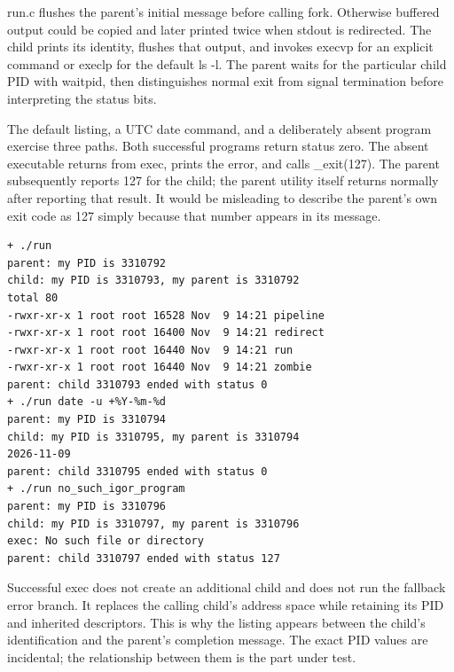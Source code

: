 \documentclass[12pt,a4paper]{article}
\begin{document}
{\ttfamily\fontsize{10}{12}\selectfont run.c} flushes the parent's
initial message before calling
{\ttfamily\fontsize{10}{12}\selectfont fork}. Otherwise buffered output
could be copied and later printed twice when stdout is redirected. The
child prints its identity, flushes that output, and invokes
{\ttfamily\fontsize{10}{12}\selectfont execvp} for an explicit command
or {\ttfamily\fontsize{10}{12}\selectfont execlp} for the default
{\ttfamily\fontsize{10}{12}\selectfont ls -l}. The parent waits for the
particular child PID with
{\ttfamily\fontsize{10}{12}\selectfont waitpid}, then distinguishes
normal exit from signal termination before interpreting the status bits.

The default listing, a UTC date command, and a deliberately absent
program exercise three paths. Both successful programs return status
zero. The absent executable returns from exec, prints the error, and
calls {\ttfamily\fontsize{10}{12}\selectfont \_exit(127)}. The parent
subsequently reports 127 for the child; the parent utility itself
returns normally after reporting that result. It would be misleading to
describe the parent's own exit code as 127 simply because that number
appears in its message.

\par\noindent\begin{minipage}{\linewidth}

\begin{lstlisting}
+ ./run
parent: my PID is 3310792
child: my PID is 3310793, my parent is 3310792
total 80
-rwxr-xr-x 1 root root 16528 Nov  9 14:21 pipeline
-rwxr-xr-x 1 root root 16400 Nov  9 14:21 redirect
-rwxr-xr-x 1 root root 16440 Nov  9 14:21 run
-rwxr-xr-x 1 root root 16440 Nov  9 14:21 zombie
parent: child 3310793 ended with status 0
+ ./run date -u +%Y-%m-%d
parent: my PID is 3310794
child: my PID is 3310795, my parent is 3310794
2026-11-09
parent: child 3310795 ended with status 0
+ ./run no_such_igor_program
parent: my PID is 3310796
child: my PID is 3310797, my parent is 3310796
exec: No such file or directory
parent: child 3310797 ended with status 127
\end{lstlisting}

\end{minipage}\par

Successful exec does not create an additional child and does not run the
fallback error branch. It replaces the calling child's address space
while retaining its PID and inherited descriptors. This is why the
listing appears between the child's identification and the parent's
completion message. The exact PID values are incidental; the
relationship between them is the part under test.
\end{document}

